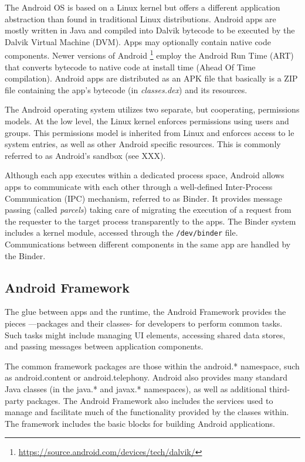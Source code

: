 The Android OS is based on a Linux kernel but offers a different application abstraction than found in traditional Linux distributions. Android apps are mostly written in Java and compiled into Dalvik bytecode to be executed by the Dalvik Virtual Machine (DVM). Apps may optionally contain native code components. Newer versions of Android \footnote{\url{https://source.android.com/devices/tech/dalvik/}} employ the Android Run Time (ART) that converts bytecode to native code at install time (Ahead Of Time compilation). Android apps are distributed as an APK file that basically is a ZIP file containing the app's bytecode (in \textit{classes.dex}) and its resources. 

The Android operating system utilizes two separate, but cooperating, permissions models. At the low level, the Linux kernel enforces permissions using users and groups. This permissions model is inherited from Linux and enforces access to  le system entries, as well as other Android specific resources. This is commonly referred to as Android’s sandbox (see XXX).

Although each app executes within a dedicated process space, Android allows apps to communicate with each other through a well-defined Inter-Process Communication (IPC) mechanism, referred to as Binder. It provides message passing (called \textit{parcels}) taking care of migrating the execution of a request from the requester to the target process transparently to the apps. The Binder system includes a kernel module, accessed through the \texttt{/dev/binder} file. Communications between different components in the same app are handled by the Binder. 

\subsection*{Android Framework}

The glue between apps and the runtime, the Android Framework provides the pieces —packages and their classes- for developers to perform common tasks. Such tasks might include managing UI elements, accessing shared data stores, and passing messages between application components. 

The common framework packages are those within the android.* namespace, such as android.content or android.telephony. Android also provides many standard Java classes (in the java.* and javax.* namespaces), as well as additional third-party packages. The Android Framework also includes the services used to manage and facilitate much of the functionality provided by the classes within. The framework includes the basic blocks for building Android applications.

